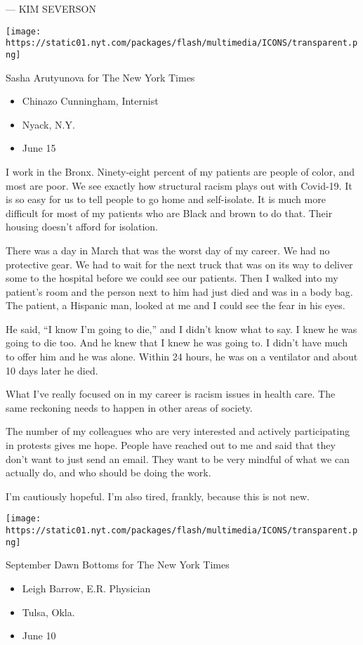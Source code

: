 --- KIM SEVERSON

\texttt{[image: https://static01.nyt.com/packages/flash/multimedia/ICONS/transparent.png]}

Sasha Arutyunova for The New York Times

\begin{itemize}
\tightlist
\item
  Chinazo Cunningham, Internist
\item
  Nyack, N.Y.
\item
  June 15
\end{itemize}

I work in the Bronx. Ninety-eight percent of my patients are people of
color, and most are poor. We see exactly how structural racism plays out
with Covid-19. It is so easy for us to tell people to go home and
self-isolate. It is much more difficult for most of my patients who are
Black and brown to do that. Their housing doesn't afford for isolation.

There was a day in March that was the worst day of my career. We had no
protective gear. We had to wait for the next truck that was on its way
to deliver some to the hospital before we could see our patients. Then I
walked into my patient's room and the person next to him had just died
and was in a body bag. The patient, a Hispanic man, looked at me and I
could see the fear in his eyes.

He said, ``I know I'm going to die,'' and I didn't know what to say. I
knew he was going to die too. And he knew that I knew he was going to. I
didn't have much to offer him and he was alone. Within 24 hours, he was
on a ventilator and about 10 days later he died.

What I've really focused on in my career is racism issues in health
care. The same reckoning needs to happen in other areas of society.

The number of my colleagues who are very interested and actively
participating in protests gives me hope. People have reached out to me
and said that they don't want to just send an email. They want to be
very mindful of what we can actually do, and who should be doing the
work.

I'm cautiously hopeful. I'm also tired, frankly, because this is not
new.

\texttt{[image: https://static01.nyt.com/packages/flash/multimedia/ICONS/transparent.png]}

September Dawn Bottoms for The New York Times

\begin{itemize}
\tightlist
\item
  Leigh Barrow, E.R. Physician
\item
  Tulsa, Okla.
\item
  June 10
\end{itemize}

